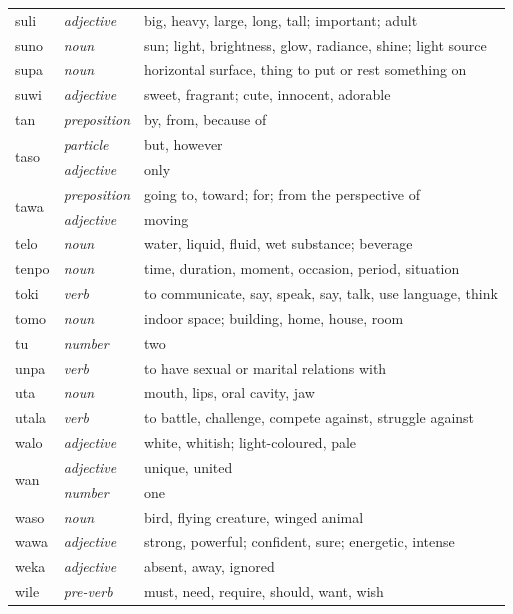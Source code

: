 \documentclass[14pt, a4paper]{extreport}
\begin{document}
\begin{longtable}{llp{10cm}}
  suli & \textit{adjective} & big, heavy, large, long, tall; important; adult \\
  suno & \textit{noun} & sun; light, brightness, glow, radiance, shine; light source \\
  supa & \textit{noun} & horizontal surface, thing to put or rest something on \\
  suwi & \textit{adjective} & sweet, fragrant; cute, innocent, adorable \\
  tan & \textit{preposition} & by, from, because of \\
  \multirow[t]{2}{*}{taso} & \textit{particle} & but, however \\
  & \textit{adjective} & only \\
  \multirow[t]{2}{*}{tawa} & \textit{preposition} & going to, toward; for; from the perspective of \\
  & \textit{adjective} & moving \\
  telo & \textit{noun} & water, liquid, fluid, wet substance; beverage \\
  tenpo & \textit{noun} & time, duration, moment, occasion, period, situation \\
  toki & \textit{verb} & to communicate, say, speak, say, talk, use language, think \\
  tomo & \textit{noun} & indoor space; building, home, house, room \\
  tu & \textit{number} & two \\
  unpa & \textit{verb} & to have sexual or marital relations with \\
  uta & \textit{noun} & mouth, lips, oral cavity, jaw \\
  utala & \textit{verb} & to battle, challenge, compete against, struggle against \\
  walo & \textit{adjective} & white, whitish; light-coloured, pale \\
  \multirow[t]{2}{*}{wan} & \textit{adjective} & unique, united \\
  & \textit{number} & one \\
  waso & \textit{noun} & bird, flying creature, winged animal \\
  wawa & \textit{adjective} & strong, powerful; confident, sure; energetic, intense \\
  weka & \textit{adjective} & absent, away, ignored \\
  wile & \textit{pre-verb} & must, need, require, should, want, wish \\
\end{longtable}
\end{document}
